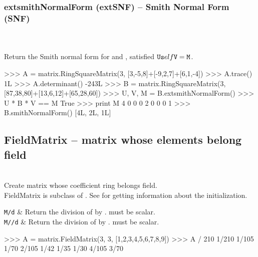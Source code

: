   \subsubsection{extsmithNormalForm (extSNF) -- Smith Normal Form (SNF)}
   \\
   \\
   \spacing
   \quad Return the Smith normal form  for  and , satisfied ${\texttt U}{\texttt self}{\texttt V}={\texttt M}$.\\
   \spacing
\begin{ex}
>>> A = matrix.RingSquareMatrix(3, [3,-5,8]+[-9,2,7]+[6,1,-4])
>>> A.trace()
1L
>>> A.determinant()
-243L
>>> B = matrix.RingSquareMatrix(3, [87,38,80]+[13,6,12]+[65,28,60])
>>> U, V, M = B.extsmithNormalForm()
>>> U * B * V == M
True
>>> print M
4 0 0
0 2 0
0 0 1
>>> B.smithNormalForm()
[4L, 2L, 1L]
\end{ex}
\C

\subsection{FieldMatrix -- matrix whose elements belong field}
  \\
  \spacing
  \quad Create matrix whose coefficient ring belongs field.\\
  \spacing
  \quad FieldMatrix is subclass of .
  See  for getting information about the initialization.\\
  \spacing
  \begin{op}
    \verb|M/d| & Return the division of  by . must be scalar.\\
    \verb|M//d| & Return the division of  by . must be scalar.\\
  \end{op}
\begin{ex}
>>> A = matrix.FieldMatrix(3, 3, [1,2,3,4,5,6,7,8,9])
>>> A / 210
1/210 1/105 1/70
2/105  1/42 1/35
1/30  4/105 3/70
\end{ex}%
\method
